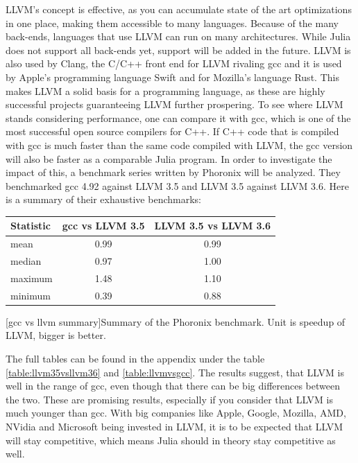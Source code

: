 \ac{LLVM}'s concept is effective, as you can accumulate state of the art optimizations in one place, making them accessible to many languages. Because of the many back-ends, languages that use \ac{LLVM} can run on many architectures. While Julia does not support all back-ends yet, support will be added in the future. 
\ac{LLVM} is also used by Clang, the C/C++ front end for \ac{LLVM} rivaling \ac{gcc} and it is used by Apple's programming language Swift and for Mozilla's language Rust.
This makes \ac{LLVM} a solid basis for a programming language, as these are highly successful projects guaranteeing \ac{LLVM} further prospering.
To see where \ac{LLVM} stands considering performance, one can compare it with \ac{gcc}, which is one of the most successful open source compilers for C++.
If C++ code that is compiled with \ac{gcc} is much faster than the same code compiled with \ac{LLVM}, the \ac{gcc} version will also be faster as a comparable Julia program.
In order to investigate the impact of this, a benchmark series written by Phoronix will be analyzed.
They benchmarked \ac{gcc} 4.92 against \ac{LLVM} 3.5 and \ac{LLVM} 3.5 against \ac{LLVM} 3.6.
Here is a summary of their exhaustive benchmarks:
\begin{table}[ht]
  \centering
  \begin{tabular}{l|c|c}
    \hline
    \textbf{Statistic} & \textbf{\ac{gcc} vs \ac{LLVM} 3.5} & \textbf{\ac{LLVM} 3.5 vs \ac{LLVM} 3.6} \\
    \hline
    mean & 0.99 & 0.99 \\
    median & 0.97 & 1.00 \\
    maximum & 1.48 & 1.10 \\
    minimum & 0.39 & 0.88 \\
    \hline
  \end{tabular}
    [gcc vs llvm summary]{Summary of the Phoronix benchmark. Unit is speedup of LLVM, bigger is better. \cite{LLVM35vsLLVM36}\cite{LLVMvsGCC}\cite{Phoronix}}
    \label{table:gccvsllvm}
\end{table}

The full tables can be found in the appendix under the table \ref{table:llvm35vsllvm36} and \ref{table:llvmvsgcc}.
The results suggest, that \ac{LLVM} is well in the range of \ac{gcc}, even though that there can be big differences between the two.
These are promising results, especially if you consider that \ac{LLVM} is much younger than \ac{gcc}. 
With big companies like Apple\cite{GoogleAppleLLVM}, Google\cite{GoogleAppleLLVM}, Mozilla\cite{Rust}, AMD\cite{LLVMAMD}, NVidia\cite{LLVMNvidia} and Microsoft\cite{MicrosoftLLVM} being invested in LLVM, it is to be expected that \ac{LLVM} will stay competitive, which means Julia should in theory stay competitive as well.


